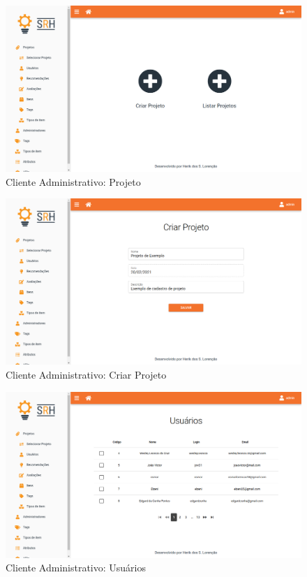 \begin{figure}[H]
	\centering
	\includegraphics[width=.9\linewidth]{imagens/adminCriarProjeto.png}
	\caption[Cliente Administrativo: Projeto]{Cliente Administrativo: Projeto}
    \label{fig:clienteAdminProjeto}
\end{figure}

\begin{figure}[H]
	\centering
	\includegraphics[width=.9\linewidth]{imagens/adminCriarProjetoForm.png}
	\caption[Cliente Administrativo: Criar Projeto]{Cliente Administrativo: Criar Projeto}
    \label{fig:clienteAdminCriarProjeto}
\end{figure}

\begin{figure}[H]
	\centering
	\includegraphics[width=.9\linewidth]{imagens/adminUsuarios.png}
	\caption[Cliente Administrativo - Usuários]{Cliente Administrativo: Usuários}
    \label{fig:clienteAdminUsuarios}
\end{figure}

